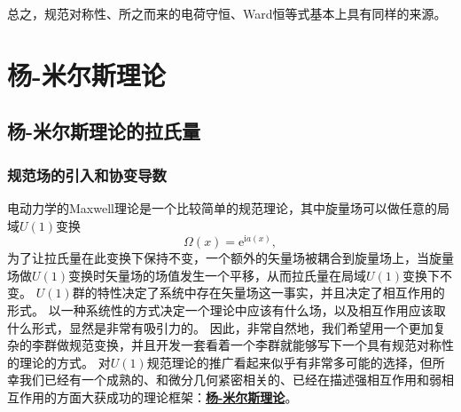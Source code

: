 \documentclass[hyperref, UTF8, a4paper]{ctexart}
\newcommand*{\ii}{\mathrm{i}}
\newcommand*{\ee}{\mathrm{e}}
\newcommand{\concept}[1]{\underline{\textbf{#1}}}
\begin{document}
总之，规范对称性、所之而来的电荷守恒、Ward恒等式基本上具有同样的来源。

\section{杨-米尔斯理论}

\subsection{杨-米尔斯理论的拉氏量}

\subsubsection{规范场的引入和协变导数}

电动力学的Maxwell理论是一个比较简单的规范理论，其中旋量场可以做任意的局域$U(1)$变换
\[
    \Omega(x) = \ee^{\ii a(x)},
\]
为了让拉氏量在此变换下保持不变，一个额外的矢量场被耦合到旋量场上，当旋量场做$U(1)$变换时矢量场的场值发生一个平移，从而拉氏量在局域$U(1)$变换下不变。
$U(1)$群的特性决定了系统中存在矢量场这一事实，并且决定了相互作用的形式。
以一种系统性的方式决定一个理论中应该有什么场，以及相互作用应该取什么形式，显然是非常有吸引力的。
因此，非常自然地，我们希望用一个更加复杂的李群做规范变换，并且开发一套看着一个李群就能够写下一个具有规范对称性的理论的方式。
对$U(1)$规范理论的推广看起来似乎有非常多可能的选择，但所幸我们已经有一个成熟的、和微分几何紧密相关的、已经在描述强相互作用和弱相互作用的方面大获成功的理论框架：\concept{杨-米尔斯理论}。
\end{document}
